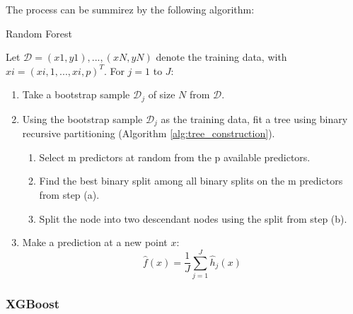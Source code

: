 The process can be summirez by the following algorithm:
\begin{tcolorbox}[colback=blue!5, colframe=blue!80, boxrule=0pt]
    \begin{algorithm} [H]
        \caption{Random Forest}
        \label{alg:random_forest}
        Let $\mathscr{D} = {(x1, y1),...,(xN, yN)}$ denote the training data, with $xi = (xi,1,..., xi,p)^T$. 
        For $j = 1$ to $J$:
        \begin{enumerate}
            \item Take a bootstrap sample $\mathscr{D}_j$ of size $N$ from $\mathscr{D}$.
            \item Using the bootstrap sample $\mathscr{D}_j$ as the training data, fit a tree using binary recursive partitioning (Algorithm \ref{alg:tree_construction}).
            \begin{enumerate}
                \item Select m predictors at random from the p available predictors.
                \item Find the best binary split among all binary splits on the m predictors from step (a).
                \item Split the node into two descendant nodes using the split from step (b).
            \end{enumerate}
            \item Make a prediction at a new point $x$: 
            \[
                \hat{f}(x) = \frac{1}{J} \sum_{j=1}^{J} \hat{h}_j(x)
            \]
        \end{enumerate}
    \end{algorithm}
\end{tcolorbox}

\subsubsection{XGBoost}

